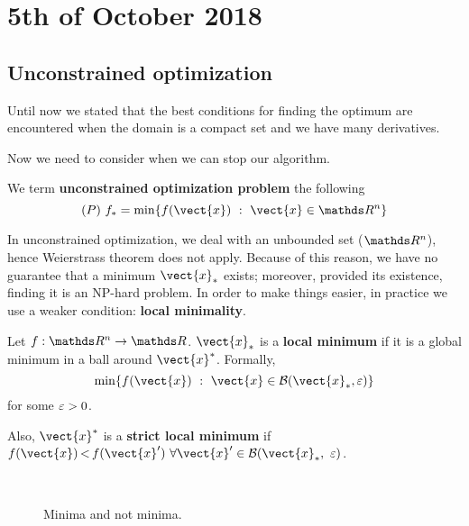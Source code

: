 \documentclass[computationalMathematics.tex]{subfiles}
\begin{document}
\chapter{5th of October 2018}

\section{Unconstrained optimization}

Until now we stated that the best conditions for finding the optimum are encountered when the domain is a compact set and we have many derivatives.

Now we need to consider when we can stop our algorithm.

\begin{definition}
We term \textbf{unconstrained optimization problem} the following
\[
(P)~f_* = \min \{f(\vect{x})~:~\vect{x} \in \R^n\}
\]
\end{definition}

In unconstrained optimization, we deal with an unbounded set ($\R^n$), hence Weierstrass theorem does not apply.
Because of this reason, we have no guarantee that a minimum $\vect{x}_*$ exists; moreover, provided its existence, finding it is an NP-hard problem. 
In order to make things easier, in practice we use a weaker condition: \textbf{local minimality}.

\begin{definition}
Let $f: \R^n \to \R$. $\vect{x}_*$ is a \textbf{local minimum} if it is a global minimum in a ball around $\vect{x}^*$.
Formally, 
\[
  \min \{f(\vect{x})~:~\vect{x} \in \mathcal{B}(\vect{x}_*, \eps) \}
\]
for some $\varepsilon > 0$.

Also, $\vect{x}^*$ is a \textbf{strict local minimum} if $f(\vect{x}) \,  {<} \, f(\vect{x}') ~ \forall \vect{x}' \in \mathcal{B}(\vect{x}_*, ~\eps)$.
\end{definition}

\begin{figure}[h]
  \centering
  \hspace{0.5cm}
  \\
  \caption{Minima and not minima.}\label{fig:5ott_1}
\end{figure}
\end{document}
